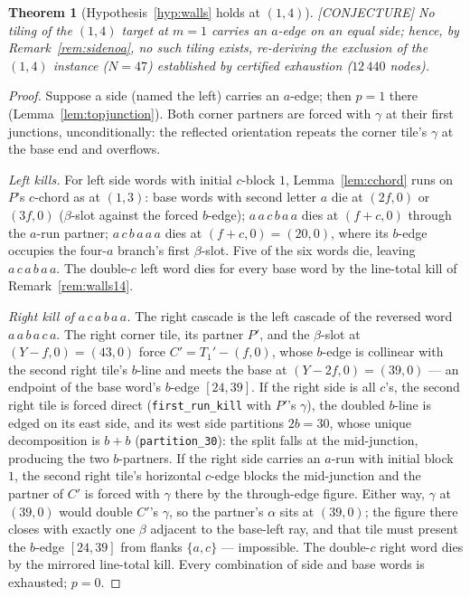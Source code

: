 \documentclass[11pt,reqno]{amsart}
\theoremstyle{plain}
\newtheorem{theorem}{Theorem}
\theoremstyle{definition}
\newcommand{\lab}[1]{\hfill\textnormal{\footnotesize\textsc{[#1]}}}
\begin{document}
\begin{theorem}[Hypothesis~\ref{hyp:walls} holds at $(1,4)$]\label{thm:walls14}\lab{CONJECTURE}
No tiling of the $(1,4)$ target at $m=1$ carries an $a$-edge on an equal side; hence, by
Remark~\ref{rem:sidenoa}, no such tiling exists, re-deriving the exclusion of the $(1,4)$ instance
($N=47$) established by certified exhaustion ($12\,440$ nodes).
\end{theorem}
\begin{proof}
Suppose a side (named the left) carries an $a$-edge; then $p=1$ there
(Lemma~\ref{lem:topjunction}). Both corner partners are forced with $\gamma$ at their first
junctions, unconditionally: the reflected orientation repeats the corner tile's $\gamma$ at the
base end and overflows.

\emph{Left kills.} For left side words with initial $c$-block $1$, Lemma~\ref{lem:cchord} runs on
$P$'s $c$-chord as at $(1,3)$: base words with second letter $a$ die at $(2f,0)$ or $(3f,0)$
($\beta$-slot against the forced $b$-edge); $a\,a\,c\,b\,a\,a$ dies at $(f+c,0)$ through the
$a$-run partner; $a\,c\,b\,a\,a\,a$ dies at $(f+c,0)=(20,0)$, where its $b$-edge occupies the
four-$a$ branch's first $\beta$-slot. Five of the six words die, leaving $a\,c\,a\,b\,a\,a$. The
double-$c$ left word dies for every base word by the line-total kill of Remark~\ref{rem:walls14}.

\emph{Right kill of $a\,c\,a\,b\,a\,a$.} The right cascade is the left cascade of the reversed
word $a\,a\,b\,a\,c\,a$. The right corner tile, its partner $P'$, and the $\beta$-slot at
$(Y-f,0)=(43,0)$ force $C'=T_1'-(f,0)$, whose $b$-edge is collinear with the second right tile's
$b$-line and meets the base at $(Y-2f,0)=(39,0)$ --- an endpoint of the base word's $b$-edge
$[24,39]$. If the right side is all $c$'s, the second right tile is forced direct
(\texttt{first\_run\_kill} with $P'$'s $\gamma$), the doubled $b$-line is edged on its east side,
and its west side partitions $2b=30$, whose unique decomposition is $b+b$
(\texttt{partition\_30}): the split falls at the mid-junction, producing the two $b$-partners. If
the right side carries an $a$-run with initial block $1$, the second right tile's horizontal
$c$-edge blocks the mid-junction and the partner of $C'$ is forced with $\gamma$ there by the
through-edge figure. Either way, $\gamma$ at $(39,0)$ would double $C'$'s $\gamma$, so the
partner's $\alpha$ sits at $(39,0)$; the figure there closes with exactly one $\beta$ adjacent to
the base-left ray, and that tile must present the $b$-edge $[24,39]$ from flanks $\{a,c\}$ ---
impossible. The double-$c$ right word dies by the mirrored line-total kill. Every combination of
side and base words is exhausted; $p=0$.
\end{proof}
\end{document}
